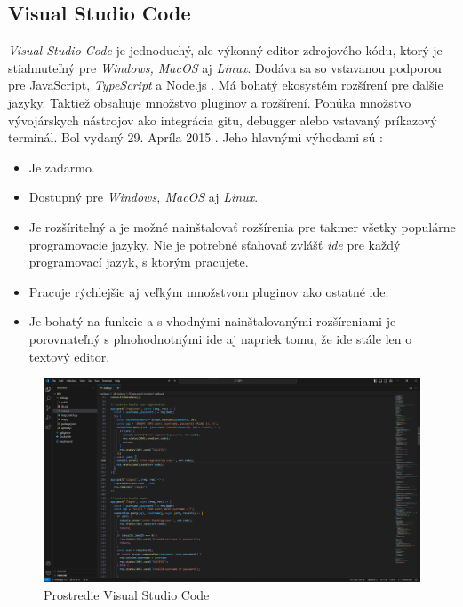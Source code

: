 \subsection{Visual Studio Code \label{section:vscode}}
\indent \indent \textit{Visual Studio Code} je jednoduchý, ale výkonný editor zdrojového kódu, ktorý je stiahnuteľný pre \textit{Windows, MacOS} aj \textit{Linux}. Dodáva sa so vstavanou podporou pre JavaScript, \textit{TypeScript} a Node.js \cite{vscode}. Má bohatý ekosystém rozšírení pre ďalšie jazyky. Taktiež obsahuje množstvo pluginov a rozšírení. Ponúka množstvo vývojárskych nástrojov ako integrácia gitu, debugger alebo vstavaný príkazový terminál. Bol vydaný 29. Apríla 2015 \cite{vscode_history}. Jeho hlavnými výhodami sú \cite{vscode_adv}:
\begin{itemize}
    \item Je zadarmo.
    \item Dostupný pre \textit{Windows, MacOS} aj \textit{Linux}.
    \item Je rozšíriteľný a je možné nainštalovať rozšírenia pre takmer všetky populárne programovacie jazyky. Nie je potrebné sťahovať zvlášť \textit{\acrshort{ide}} pre každý programovací jazyk, s ktorým pracujete.
    \item Pracuje rýchlejšie aj veľkým množstvom pluginov ako ostatné \acrshort{ide}. 
    \item Je bohatý na funkcie a s vhodnými nainštalovanými rozšíreniami je porovnateľný s plnohodnotnými \acrshort{ide} aj napriek tomu, že ide stále len o textový editor.
\end{itemize}
\begin{figure}
    \centering
    \includegraphics[width=1\linewidth]{img/vscode.png}
    \caption{Prostredie Visual Studio Code}
\end{figure}

